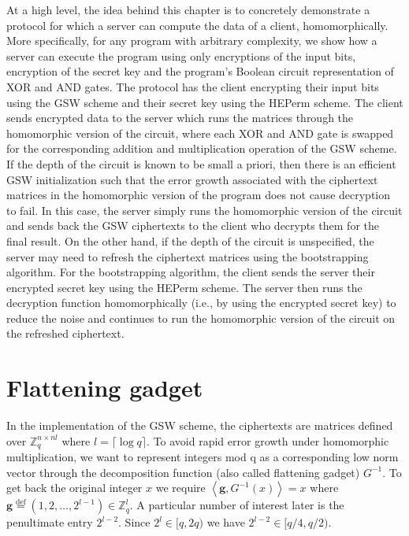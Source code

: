At a high level, the idea behind this chapter is to concretely demonstrate a protocol for which a server can compute the data of a client, homomorphically. More specifically, for any program with arbitrary complexity, we show how a server can execute the program using only encryptions of the input bits, encryption of the secret key and the program's Boolean circuit representation of XOR and AND gates. The protocol has the client encrypting their input bits using the GSW scheme and their secret key using the HEPerm scheme. The client sends encrypted data to the server which runs the matrices through the homomorphic version of the circuit, where each XOR and AND gate is swapped for the corresponding addition and multiplication operation of the GSW scheme. If the depth of the circuit is known to be small a priori, then there is an efficient GSW initialization such that the error growth associated with the ciphertext matrices in the homomorphic version of the program does not cause decryption to fail. In this case, the server simply runs the homomorphic version of the circuit and sends back the GSW ciphertexts to the client who decrypts them for the final result. On the other hand, if the depth of the circuit is unspecified, the server may need to refresh the ciphertext matrices using the bootstrapping algorithm. For the bootstrapping algorithm, the client sends the server their encrypted secret key using the HEPerm scheme. The server then runs the decryption function homomorphically (i.e., by using the encrypted secret key) to reduce the noise and continues to run the homomorphic version of the circuit on the refreshed ciphertext.

\section{Flattening gadget}

In the implementation of the GSW scheme, the ciphertexts are matrices defined over $\mathbb{Z}_q^{n \times nl}$ where $l = \lceil \log q \rceil$. To avoid rapid error growth under homomorphic multiplication, we want to represent integers mod q as a corresponding low norm vector through the decomposition function (also called flattening gadget) $G^{-1}$. To get back the original integer $x$ we require $\left \langle \mathbf{g}, G^{-1}(x) \right \rangle = x$ where $\mathbf{g} \stackrel{\mathrm{def}}{=} (1, 2, \dots, 2^{l-1}) \in \mathbb{Z}_q^l$. A particular number of interest later is the penultimate entry $2^{l-2}$. Since $2^l \in [q, 2q)$ we have $2^{l-2} \in [q/4, q/2)$. 

